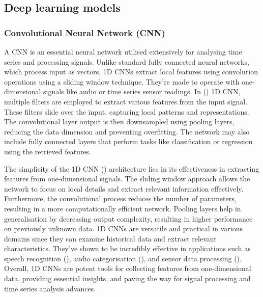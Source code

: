 \documentclass[a4paper, fleqn]{cas-sc}
\theoremstyle{definition}
\theoremstyle{remark}
\begin{document}
\subsection{Deep learning models}
\subsubsection{Convolutional Neural Network (CNN)}
A CNN is an essential neural network utilised extensively for analysing time series and processing signals. Unlike standard fully connected neural networks,  which process input as vectors,  1D CNNs extract local features using convolution operations using a sliding window technique. They're made to operate with one-dimensional signals like audio or time series sensor readings. In  (\cite{chaerun2021comparative}) 1D CNN,  multiple filters are employed to extract various features from the input signal. These filters slide over the input,  capturing local patterns and representations. The convolutional layer output is then downsampled using pooling layers,  reducing the data dimension and preventing overfitting. The network may also include fully connected layers that perform tasks like classification or regression using the retrieved features.
\par The simplicity of the 1D CNN (\cite{kiranyaz20211d}) architecture lies in its effectiveness in extracting features from one-dimensional signals. The sliding window approach allows the network to focus on local details and extract relevant information effectively. Furthermore,  the convolutional process reduces the number of parameters,  resulting in a more computationally efficient network. Pooling layers help in generalisation by decreasing output complexity,  resulting in higher performance on previously unknown data. 1D CNNs are versatile and practical in various domains since they can examine historical data and extract relevant characteristics. They've shown to be incredibly effective in applications such as speech recognition (\cite{rusnac2022cnn, wang2019end}),  audio categorisation (\cite{ashraf2022role, hu2020device}),  and sensor data processing (\cite{kattenborn2021review, sun2019classification}). Overall,  1D CNNs are potent tools for collecting features from one-dimensional data,  providing essential insights,  and paving the way for signal processing and time series analysis advances.
\end{document}
